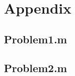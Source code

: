 \documentclass[a4paper]{article}
\begin{document}


\section*{Appendix}
\subsection*{Problem1.m}



\subsection*{Problem2.m}




 


\end{document}
